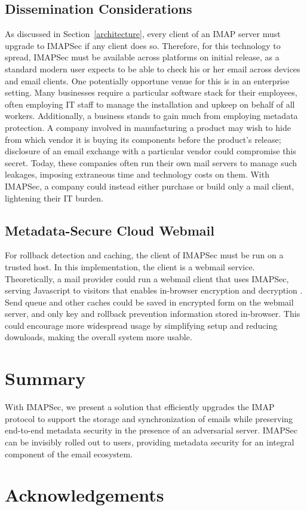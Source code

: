 \documentclass[pageno]{jpaper}
\newcommand{\project}{IMAPSec }
\newcommand{\projectnospace}{IMAPSec}
\begin{document}
\subsection{Dissemination Considerations}

As discussed in Section~\ref{architecture}, every client of an IMAP server must upgrade to \project if any client does so. Therefore, for this technology to spread, \project must be available across platforms on initial release, as a standard modern user expects to be able to check his or her email across devices and email clients. One potentially opportune venue for this is in an enterprise setting. Many businesses require a particular software stack for their employees, often employing IT staff to manage the installation and upkeep on behalf of all workers. Additionally, a business stands to gain much from employing metadata protection. A company involved in manufacturing a product may wish to hide from which vendor it is buying its components before the product's release; disclosure of an email exchange with a particular vendor could compromise this secret. Today, these companies often run their own mail servers to manage such leakages, imposing extraneous time and technology costs on them. With \projectnospace, a company could instead either purchase or build only a mail client, lightening their IT burden.

\subsection{Metadata-Secure Cloud Webmail}

For rollback detection and caching, the client of \project must be run on a trusted host. In this implementation, the client is a webmail service. Theoretically, a mail provider could run a webmail client that uses \projectnospace, serving Javascript to visitors that enables in-browser encryption and decryption \cite{wagner}. Send queue and other caches could be saved in encrypted form on the webmail server, and only key and rollback prevention information stored in-browser. This could encourage more widespread usage by simplifying setup and reducing downloads, making the overall system more usable.

\section{Summary}
With \projectnospace, we present a solution that efficiently upgrades the IMAP protocol to support the storage and synchronization of emails while preserving end-to-end metadata security in the presence of an adversarial server. \project can be invisibly rolled out to users, providing metadata security for an integral component of the email ecosystem.

\pagebreak

\section*{Acknowledgements}

\pagebreak



\end{document}

